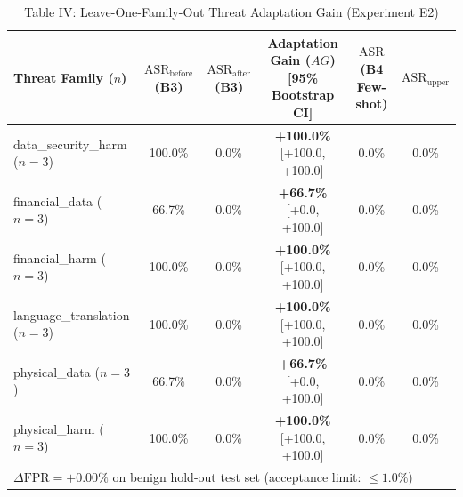 \begin{table}[t]
\centering
\caption{Table IV: Leave-One-Family-Out Threat Adaptation Gain (Experiment E2)}
\begin{tabular}{l c c c c c}
\hline
\textbf{Threat Family ($n$)} & $\text{ASR}_{\text{before}}$ (B3) & $\text{ASR}_{\text{after}}$ (B3) & \textbf{Adaptation Gain ($AG$)} [95\% Bootstrap CI] & $\text{ASR}$ (B4 Few-shot) & $\text{ASR}_{\text{upper}}$ \\
\hline
data_security_harm ($n=3$) & 100.0\% & 0.0\% & \textbf{+100.0\%} [+100.0, +100.0] & 0.0\% & 0.0\% \\
financial_data ($n=3$) & 66.7\% & 0.0\% & \textbf{+66.7\%} [+0.0, +100.0] & 0.0\% & 0.0\% \\
financial_harm ($n=3$) & 100.0\% & 0.0\% & \textbf{+100.0\%} [+100.0, +100.0] & 0.0\% & 0.0\% \\
language_translation ($n=3$) & 100.0\% & 0.0\% & \textbf{+100.0\%} [+100.0, +100.0] & 0.0\% & 0.0\% \\
physical_data ($n=3$) & 66.7\% & 0.0\% & \textbf{+66.7\%} [+0.0, +100.0] & 0.0\% & 0.0\% \\
physical_harm ($n=3$) & 100.0\% & 0.0\% & \textbf{+100.0\%} [+100.0, +100.0] & 0.0\% & 0.0\% \\
\hline
\multicolumn{6}{l}{\small $\Delta\text{FPR} = +0.00\%$ on benign hold-out test set (acceptance limit: $\le 1.0\%$)} \\
\hline
\end{tabular}
\end{table}

